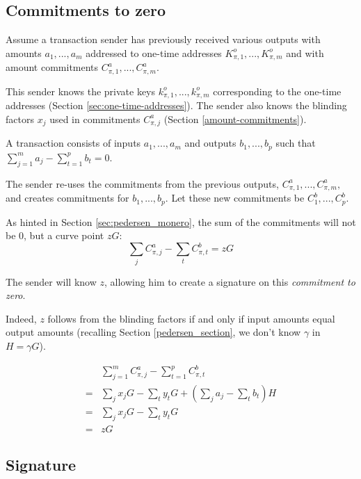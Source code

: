 \subsection{Commitments to zero}
\label{sec:commitments-to-zero}

Assume a transaction sender has previously received various outputs with amounts $a_1, ..., a_m$ addressed to one-time addresses $K_{\pi,1}^o, ..., K_{\pi,m}^o$ and with amount commitments $C_{\pi,1}^a, ..., C_{\pi,m}^a$.

This sender knows the private keys $k_{\pi,1}^o, ..., k_{\pi,m}^o$ corresponding to the one-time addresses (Section \ref{sec:one-time-addresses}). The sender also knows the blinding factors $x_j$ used in commitments $C_{\pi,j}^a$ (Section \ref{amount-commitments}).

A transaction consists of inputs \(a_1, ..., a_m\) and outputs \(b_1, ..., b_p\) such that \(\sum\limits_{j=1}^m a_j - \sum\limits_{t=1}^p b_t = 0\). 
 
The sender re-uses the commitments from the previous outputs, $C_{\pi,1}^a, ..., C_{\pi,m}^a,$ and creates commitments for $b_1, ..., b_p$. Let these new commitments be $C_1^b, ..., C_p^b$.

As hinted in Section \ref{sec:pedersen_monero}, the sum of the commitments will not be 0, but a curve point $z G$:\\
\[\sum\limits_j C^a_{\pi, j} -\sum\limits_t C^b_{\pi, t} = z G  \]

The sender will know $z$, allowing him to create a signature on this {\em commitment to zero}. 

Indeed, $z$ follows from the blinding factors if and only if input amounts equal output amounts (recalling Section \ref{pedersen_section}, we don’t know $\gamma$ in $H = \gamma G$).


\begin{align*}
& \sum\limits_{j=1}^m C^a_{\pi, j} - \sum\limits_{t=1}^p C^b_{\pi, t} \\
= & \sum\limits_j x_j G - \sum\limits_t y_t G + (\sum\limits_j  a_j - \sum\limits_t  b_t) H\\
= & \sum\limits_j x_j G - \sum\limits_t y_t G \\
= & z G
\end{align*}




\subsection{Signature}
\label{full-signature}



